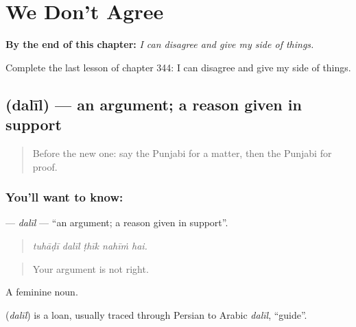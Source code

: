 
\chapter{We Don't Agree}
\label{ch:pa-a2-we-don-t-agree}

\begin{chapteropening}
\textbf{By the end of this chapter:} \emph{I can disagree and give my side of things.}

Complete the last lesson of chapter 344: I can disagree and give my side of things.
\end{chapteropening}

\section[\texorpdfstring{\pa{ਦਲੀਲ} (dalīl)}{ਦਲੀਲ (dalīl)}]{ (dalīl) — an argument; a reason given in support}

\label{lesson:PA-C344-dalil}



\begin{quote}
Before the new one: say the Punjabi for a matter, then the Punjabi for proof.
\end{quote}

\subsection*{You'll want to know: }
\textbf{} — \emph{dalīl} — \textquotedblleft{}an argument; a reason given in support\textquotedblright{}.

\begin{quote}
    
\end{quote}

\begin{quote}
\emph{tuhāḍī dalīl ṭhīk nahīṁ hai.}
\end{quote}

\begin{quote}
Your argument is not right.
\end{quote}

A feminine noun.

\begin{cousinweb}
\textbf{} (\emph{dalīl}) is a loan, usually traced through Persian to Arabic \emph{dalīl}, \textquotedblleft{}guide\textquotedblright{}.
\end{cousinweb}

